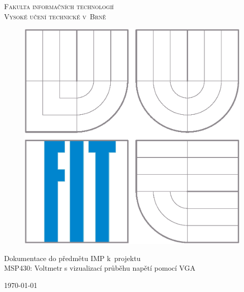\documentclass[a4paper, 11pt, titlepage]{article}
\begin{document}
\begin{titlepage}
\begin{center}
	\Large \textsc{Fakulta informačních technologií \\ Vysoké učení technické v~Brně} \\

	\begin{figure}[h]
		\begin{center}
    		\scalebox{0.35}
    		{   
        		\includegraphics{./img/logo.eps}
    		}
		\end{center}
	\end{figure}

	Dokumentace do předmětu IMP k~projektu \\ \huge{MSP430: Voltmetr s vizualizací průběhu napětí pomocí VGA}  \\

	\begin{center}
	{\Large \today}
	\end{center}


\end{center}
\end{titlepage}
\end{document}
